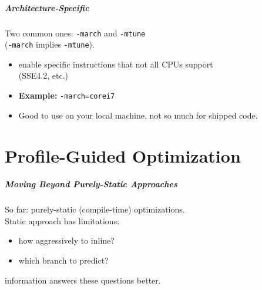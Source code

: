 \begin{frame}
  \frametitle{Architecture-Specific}

  
  Two common ones: {\tt -march} and {\tt -mtune}\\ \qquad\qquad ({\tt -march} implies {\tt -mtune}).

  \begin{itemize}
    \item enable  specific instructions that not all CPUs  support\\
      \qquad \qquad (SSE4.2, etc.)
    \vfill
    \item {\bf Example:} {\tt -march=corei7}
    \vfill
    \item Good to use on your local machine, not so much for shipped code.
  \end{itemize}
  
\end{frame}

\part{Profile-Guided Optimization}
\frame{\partpage}

\begin{frame}
  \frametitle{Moving Beyond Purely-Static Approaches}

  
    So far: purely-static (compile-time) optimizations.\\[1em]

    Static approach has limitations: 
    \begin{itemize}
      \item how aggressively to inline?
      \item which branch to predict?
    \end{itemize}
     information answers these questions better.

  

\end{frame}


